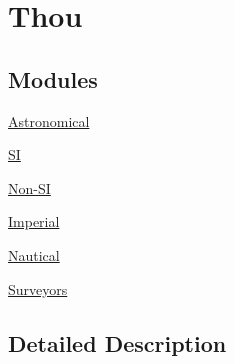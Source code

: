 \hypertarget{group___e_g_x_math-_conversions-_length_conversions-_imperial-_thou}{}\section{Thou}
\label{group___e_g_x_math-_conversions-_length_conversions-_imperial-_thou}
\subsection*{Modules}
\begin{DoxyCompactItemize}
\item 
\mbox{\hyperlink{group___e_g_x_math-_conversions-_length_conversions-_imperial-_thou-_astronomical}{Astronomical}}
\item 
\mbox{\hyperlink{group___e_g_x_math-_conversions-_length_conversions-_imperial-_thou-_s_i}{SI}}
\item 
\mbox{\hyperlink{group___e_g_x_math-_conversions-_length_conversions-_imperial-_thou-_non-_s_i}{Non-\/\+SI}}
\item 
\mbox{\hyperlink{group___e_g_x_math-_conversions-_length_conversions-_imperial-_thou-_imperial}{Imperial}}
\item 
\mbox{\hyperlink{group___e_g_x_math-_conversions-_length_conversions-_imperial-_thou-_nautical}{Nautical}}
\item 
\mbox{\hyperlink{group___e_g_x_math-_conversions-_length_conversions-_imperial-_thou-_surveyors}{Surveyors}}
\end{DoxyCompactItemize}


\subsection{Detailed Description}
